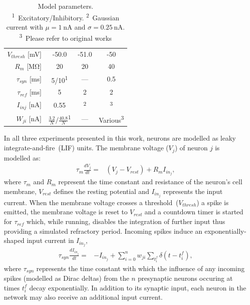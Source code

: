 \documentclass[9pt,twocolumn,twoside,lineno]{pnas-new}
\begin{document}
{\begin{table}
\begin{tabular}{r S S S}
        $V_{thresh}$ [\si{\milli\volt}]         & -50.0                     & -51.0             & -50 \\
        $R_m$ [\si{\mega\ohm}]                  & 20                        & 20                & 40 \\
        $\tau_{syn}$ [\si{\milli\second}]       & 5/10\textsuperscript{1}   & {---}             & 0.5\\
        $\tau_{ref}$ [\si{\milli\second}]       & 5                         & 2                 & 2 \\
        $I_{inj}$ [\si{\nano\ampere}]           & 0.55                      & \textsuperscript{2}   & \textsuperscript{3}\\
        $W_{ji}$ [\si{\nano\ampere}]            & $\frac{3.2}{N}/\frac{40.8}{N}$\textsuperscript{1}           & {---}            & Various\textsuperscript{3}\\
    \bottomrule
  \end{tabular}
  \caption{Model parameters.\\
  \textsuperscript{1}~Excitatory/Inhibitory. \textsuperscript{2}~Gaussian current with $\mu=\SI{1}{\nano\ampere}$ and $\sigma=\SI{0.25}{\nano\ampere}$. \textsuperscript{3}~Please refer to original works\citep[Table 1,2]{Schmidt2018}}
  \label{tab:parameters}
\end{table}
In all three experiments presented in this work, neurons are modelled as leaky integrate-and-fire~(LIF) units.
The membrane voltage ($V_{j}$) of neuron $j$ is modelled as:
%
\begin{align}
    \tau_{m} \frac{dV_{j}}{dt} = & (V_{j} - V_{rest}) + R_{m} I_{{in}_{j}}, \label{eq:lif_neuron}
\end{align}
%
where $\tau_{m}$ and $R_{m}$ represent the time constant and resistance of the neuron's cell membrane, $V_{rest}$ defines the resting potential and $I_{{in}_{j}}$ represents the input current.
When the membrane voltage crosses a threshold~($V_{thresh}$) a spike is emitted, the membrane voltage is reset  to $V_{rest}$ and a countdown timer is started for $\tau_{ref}$ which, while running, disables the integration of further input thus providing a simulated refractory period.
Incoming spikes induce an exponentially-shaped input current in $I_{{in}_{j}}$,
%
\begin{align}
    \tau_{syn} \frac{dI_{{in}_{j}}}{dt} = & -I_{{in}_{j}} + \sum_{i=0}^{n} w_{ji} \sum_{t_{i}^{f}}  \delta(t - t_{i}^{f}),\label{eq:exp_neuron_input_current}
\end{align}
%
where $\tau_{syn}$ represents the time constant with which the influence of any incoming spikes (modelled as Dirac deltas) from the $n$ presynaptic neurons occuring at times $t_{i}^{f}$ decay exponentially.
In addition to its synaptic input, each neuron in the network may also receive an additional input current.}
\showmatmethods{} %
\end{document}
